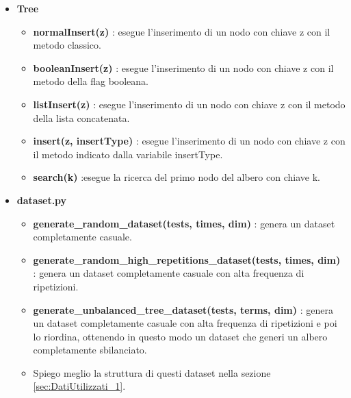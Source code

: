 \begin{itemize}

    \item \textbf{Tree}
    \begin{itemize}
    
        \item \textbf{normalInsert(z)} : esegue l'inserimento di un nodo con chiave z con il metodo classico.
        
        \item \textbf{booleanInsert(z)} : esegue l'inserimento di un nodo con chiave z con il metodo della flag booleana.
        
        \item \textbf{listInsert(z)} : esegue l'inserimento di un nodo con chiave z con il metodo della lista concatenata.
        
        \item \textbf{insert(z, insertType)} : esegue l'inserimento di un nodo con chiave z con il metodo indicato dalla variabile insertType.
        
        \item \textbf{search(k)} :esegue la ricerca del primo nodo del albero con chiave k.
                
    \end{itemize}
    
    \item \textbf{dataset.py}
    \begin{itemize}
        \item \textbf{generate\_random\_dataset(tests, times, dim)} : genera un dataset completamente casuale.
        
        \item \textbf{generate\_random\_high\_repetitions\_dataset(tests, times, dim)} : genera un dataset completamente casuale con alta frequenza di ripetizioni.
        
        \item \textbf{generate\_unbalanced\_tree\_dataset(tests, terms, dim)} : genera un dataset completamente casuale con alta frequenza di ripetizioni e poi lo riordina, ottenendo in questo modo un dataset che generi un albero completamente sbilanciato. 
        
        \item Spiego meglio la struttura di questi dataset nella sezione \ref{sec:DatiUtilizzati_1}.
        
    \end{itemize}
    

\end{itemize}
